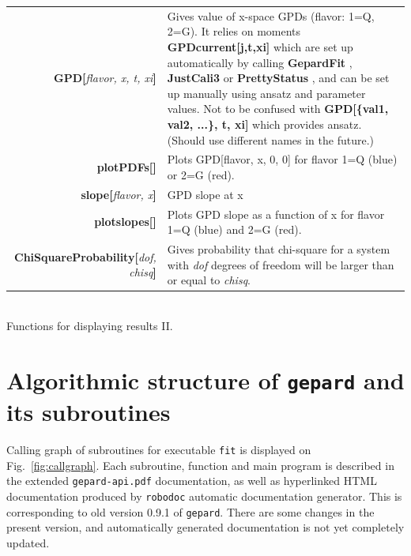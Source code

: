 \documentclass[12pt]{article}
\newcommand{\defboxitem}[3]{ {\ttfamily \bfseries #1[}\emph{#2}{\ttfamily \bfseries ]} & #3 }
\newcommand{\mmacomm}[1]{ {\ttfamily \bfseries #1} }
\begin{document}
\begin{flushleft}
\colorbox{defbox}{%
\begin{minipage}{\textwidth}%
\begin{tabular}{rp{8cm}}%
\defboxitem{GPD}{flavor, x, t, xi}{Gives value of x-space GPDs (flavor: 1=Q, 2=G). 
It relies on moments \mmacomm{GPDcurrent[j,t,xi]} which are set up automatically
by calling \mmacomm{GepardFit}, \mmacomm{JustCali3} or \mmacomm{PrettyStatus}, and can
be set up manually using ansatz and parameter values. Not to be confused with
\mmacomm{GPD[\{val1, val2, ...\}, t, xi]} which provides ansatz. (Should use
different names in the future.)} \\[0.8ex]
\defboxitem{plotPDFs}{}{Plots GPD[flavor, x, 0, 0] for flavor 1=Q (blue) 
or 2=G (red).} \\[0.8ex]
\defboxitem{slope}{flavor, x}{GPD slope at x} \\[0.8ex]
\defboxitem{plotslopes}{}{Plots GPD slope as a function of x for flavor 1=Q (blue) and
 2=G (red).} \\[0.8ex]
\defboxitem{ChiSquareProbability}{dof, chisq}{Gives probability that chi-square
for a system with \emph{dof} degrees of freedom will be larger than or equal to \emph{chisq}.}
\end{tabular}%
\end{minipage}}\\[0.5ex]
{\small Functions for displaying results II.}
\end{flushleft}

\section{Algorithmic structure of \texttt{gepard} and its subroutines}

Calling graph of subroutines for executable \texttt{fit} is displayed on
Fig.~\ref{fig:callgraph}. Each subroutine,
function and main program is described in the extended \texttt{gepard-api.pdf} documentation,
as well as hyperlinked HTML documentation produced by \texttt{robodoc} automatic
documentation generator. This is corresponding to old version 0.9.1 of \texttt{gepard}.
There are some changes in the present version, and automatically generated documentation
is not yet completely updated.
\end{document}
